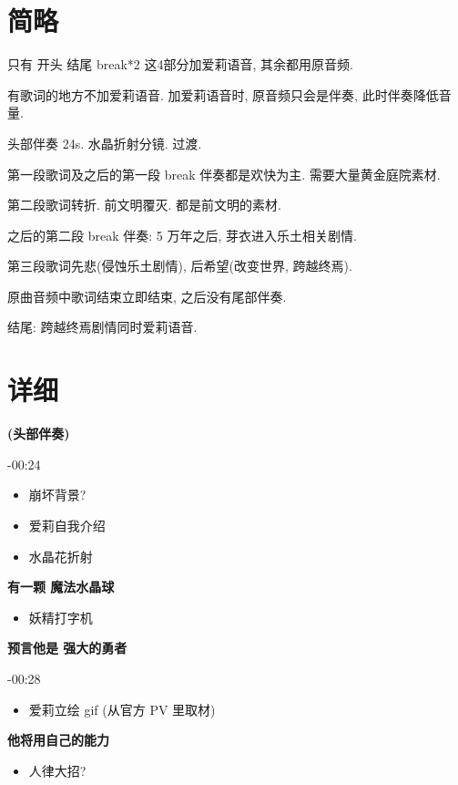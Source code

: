 \documentclass[a4paper]{article}
\begin{document}
\section{简略}

只有 开头 结尾 break*2 这4部分加爱莉语音, 其余都用原音频.

有歌词的地方不加爱莉语音. 加爱莉语音时, 原音频只会是伴奏, 此时伴奏降低音量.

头部伴奏 24s. 水晶折射分镜. 过渡.

第一段歌词及之后的第一段 break 伴奏都是欢快为主. 需要大量黄金庭院素材.

第二段歌词转折. 前文明覆灭. 都是前文明的素材.

之后的第二段 break 伴奏: 5 万年之后, 芽衣进入乐土相关剧情.

第三段歌词先悲(侵蚀乐土剧情), 后希望(改变世界, 跨越终焉).

原曲音频中歌词结束立即结束, 之后没有尾部伴奏.

结尾: 跨越终焉剧情同时爱莉语音.

\section{详细}

\textbf{(头部伴奏)}

-00:24

\begin{itemize}
    \item 崩坏背景?
    \item 爱莉自我介绍
    \item 水晶花折射
\end{itemize}

\textbf{有一颗 魔法水晶球}

\begin{itemize}
    \item 妖精打字机
\end{itemize}

\textbf{预言他是 强大的勇者}

-00:28

\begin{itemize}
    \item 爱莉立绘 gif (从官方 PV 里取材)
\end{itemize}

\textbf{他将用自己的能力}

\begin{itemize}
    \item 人律大招?
\end{itemize}
\end{document}
